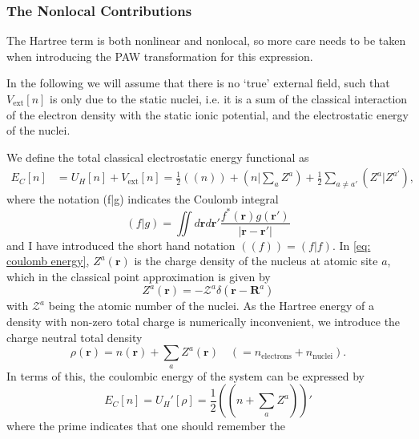 \documentclass[a4paper]{article}
\newcommand{\br}{\mathbf{r}}
\newcommand{\bR}{\mathbf{R}}
\newcommand{\Z}{\mathcal{Z}}
\begin{document}
\subsubsection{The Nonlocal Contributions}
The Hartree term is both nonlinear and nonlocal, so more care needs to be taken when introducing the PAW transformation for this expression.
\par In the following we will assume that there is no `true' external field, such that $V_\text{ext}[n]$ is only due to the static nuclei, i.e. it is a sum of the classical interaction of the electron density with the static ionic potential, and the electrostatic energy of the nuclei.
\par We define the total classical electrostatic energy functional as
%
\begin{equation}\label{eq: coulomb energy}
  \begin{split}
    E_C[n] &= U_H[n] + V_\text{ext}[n] = \frac{1}{2} ((n)) + (n|\textstyle\sum_a Z^a) + \frac{1}{2} \sum_{a\neq a'} (Z^a | Z^{a'}),%
  \end{split}
\end{equation}
%
where the notation (f|g) indicates the Coulomb integral
%
\begin{equation}
(f|g) = \iint d\br d\br' \frac{f^*(\br) g(\br') }{|\br-\br'|}
\end{equation}
%
and I have introduced the short hand notation $((f)) = (f|f)$. In \ref{eq: coulomb energy}, $Z^a(\br)$ is the charge density of the nucleus at atomic site $a$, which in the classical point approximation is given by
%
\begin{equation}
  Z^a(\br) = -\Z^a\delta(\br-\bR^a)
\end{equation}
%
with $\Z^a$ being the atomic number of the nuclei. As the Hartree energy of a density with non-zero total charge is numerically inconvenient, we introduce the charge neutral total density
%
\begin{equation}
  \rho(\br) = n(\br) + \sum_a Z^a(\br) \quad (= n_\text{electrons} + n_\text{nuclei}).
\end{equation}
%
In terms of this, the coulombic energy of the system can be expressed by
%
\begin{equation}\label{eq: coulomb energy reduced}
  E_C[n] = U_H'[\rho] = \frac{1}{2}((n+{\textstyle\sum_a Z^a}))'
\end{equation}
%
where the prime indicates that one should remember the
\end{document}
